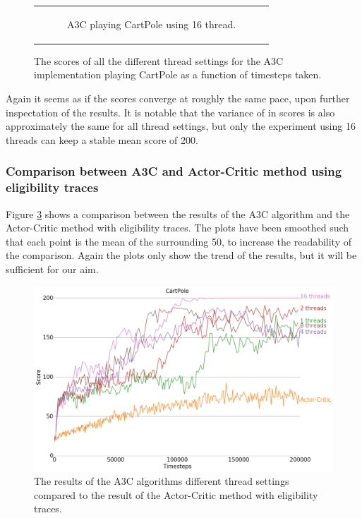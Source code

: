 \documentclass[11pt]{article}
\begin{document}
\begin{figure}[H]
\begin{tabular}[c]{c}
\begin{subfigure}[c]{.5\textwidth}
        \caption{A3C playing CartPole using 16 thread.}
        \label{cp:16}
    \end{subfigure}
  \end{tabular}
  \caption{The scores of all the different thread settings for the
    A3C implementation playing CartPole as a function of timesteps taken.}
     \label{fig:a3c_comp_steps}
\end{figure}

Again it seems as if the scores converge at roughly the same pace,
upon further inspectation of the results.
It is notable that the variance of in scores is also approximately
the same for all thread settings, but only the experiment using 16 threads
can keep a stable mean score of 200.


\subsubsection{Comparison between A3C and Actor-Critic method using eligibility traces}

Figure \ref{fig:a3c_comp_eligibility} shows a comparison between the
results of the A3C algorithm and the Actor-Critic method with eligibility
traces.
The plots have been smoothed such that each point is the mean of the surrounding 50,
to increase the readability of the comparison.
Again the plots only show the trend of the results, but it will be sufficient
for our aim.

\begin{figure}[H]
    \centering
    \includegraphics[scale=0.4]{plots/cartpole_compare_counter_with_AC.png}
    \caption{The results of the A3C algorithms different thread
            settings compared to the result of the Actor-Critic method
            with eligibility traces.}
    \label{fig:a3c_comp_eligibility}
\end{figure}
\end{document}
